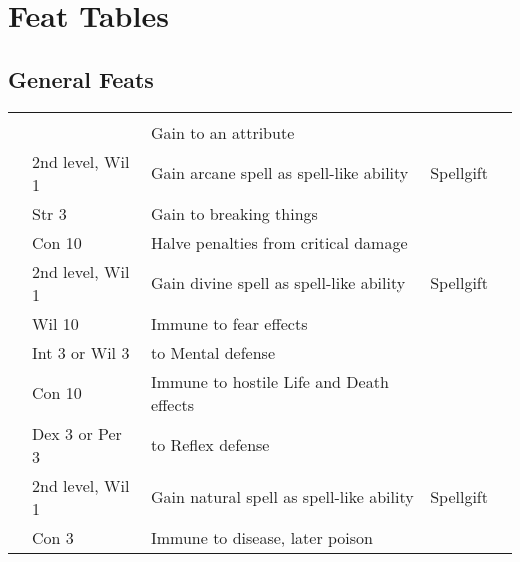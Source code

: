 \section{Feat Tables}
\onecolumn

\subsection{General Feats}
\begin{longtabuwrapper}
    \begin{longtabu}{>{\lcol}p{10em} >{\lcol}p{15em} >{\lcol}X >{\lcol}p{8em} >{\lcol}p{3em}}
         &  &  &  &  \\
         & \x & Gain  to an attribute           & \x &  \\
         & 2nd level, Wil 1 & Gain arcane spell as spell-like ability & Spellgift &  \\
         & Str 3 & Gain  to breaking things            & \x &  \\
         & Con 10 & Halve penalties from critical damage         & \x &  \\
         & 2nd level, Wil 1 & Gain divine spell as spell-like ability & Spellgift &  \\
         & Wil 10 & Immune to fear effects                      & \x &  \\
         & Int 3 or Wil 3 &  to Mental defense           & \x &  \\
         & Con 10 & Immune to hostile Life and Death effects   & \x &  \\
         & Dex 3 or Per 3 &   to Reflex defense & \x &  \\
         & 2nd level, Wil 1 & Gain natural spell as spell-like ability & Spellgift &  \\
         & Con 3 & Immune to disease, later poison        & \x &  \\

\end{longtabu}
\end{longtabuwrapper}
